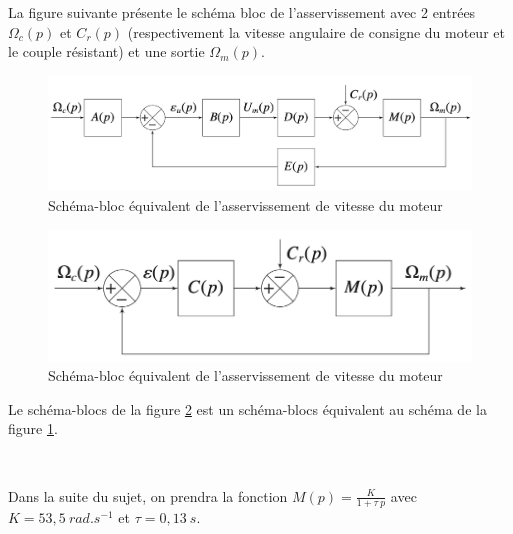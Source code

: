 La figure suivante présente le schéma bloc de l'asservissement avec 2 entrées $\Omega_c(p)$ et $C_r(p)$ (respectivement la vitesse angulaire de consigne du moteur et le couple résistant) et une sortie $\Omega_m(p)$.

\begin{figure}[!h]
\centering\includegraphics[width=0.55\linewidth]{img/figure15}
 \caption{Schéma-bloc équivalent de l'asservissement de vitesse du moteur}
 \label{img15}
\end{figure}



\begin{figure}[!h]
\centering\includegraphics[width=0.4\linewidth]{img/figure16}
 \caption{Schéma-bloc équivalent de l'asservissement de vitesse du moteur}
 \label{img16}
\end{figure}

Le schéma-blocs de la figure \ref{img16} est un schéma-blocs équivalent au schéma de la figure \ref{img15}.



~\

Dans la suite du sujet, on prendra la fonction $M(p)=\frac{K}{1+\tau\ p}$ avec $K=53,5\ rad.s^{-1}$ et $\tau=0,13\ s$.

